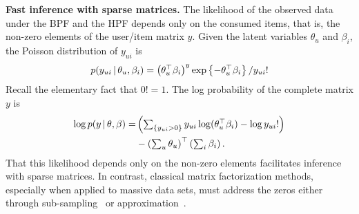 {\bf Fast inference with sparse matrices.}
The likelihood of the observed data under the BPF and the HPF depends
only on the consumed items, that is, the non-zero elements of the
user/item matrix $y$.  Given the latent variables $\theta_u$ and
$\beta_i$, the Poisson distribution of $y_{ui}$ is
\begin{equation}
  p(y_{ui} \,\vert\, \theta_u, \beta_i) =
  \left(\theta_u^\top \beta_i\right)^y
  \exp\left\{-\theta_u^\top \beta_i \right\} / y_{ui}!
\end{equation}
Recall the elementary fact that $0! = 1$.  The log probability of the
complete matrix $y$ is
\begin{align}
  \log p(y \,\vert\, \theta, \beta) =
  & \left(\textstyle \sum_{\{y_{ui} > 0\}}
    y_{ui} \log (\theta_u^\top \beta_i) - \log y_{ui}!
  \right) \\
  & -
  \left(\textstyle\sum_{u} \theta_u\right)^\top \left(\textstyle
    \sum_{i} \beta_i\right).
\end{align}
That this likelihood depends only on the non-zero elements facilitates
inference with sparse matrices.  In contrast, classical matrix
factorization methods, especially when applied to
massive data sets, must address the zeros either through
sub-sampling~\cite{Dror:2012a} or approximation~\cite{Hu:2008p9402}.


